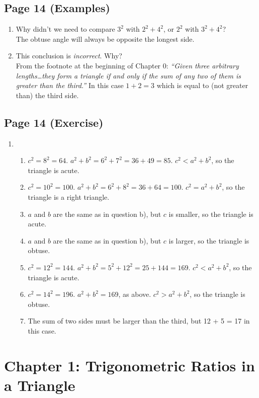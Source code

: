 \documentclass{article}
\newenvironment{solutions}[1]
{\subsection*{#1}
 \begin{enumerate}[leftmargin=1.5em]}
{\end{enumerate}}
\newcommand{\solution}{\item}
\newenvironment{subsolutions}
{\begin{enumerate}}
{\end{enumerate}}
\newcommand{\subsolution}{\item}
\begin{document}
\begin{solutions}{Page 14 (Examples)}
\solution Why didn't we need to compare $3^2$ with $2^2 + 4^2$, or $2^2$ with $3^2 + 4^2$?\\
The obtuse angle will always be opposite the longest side. 
\solution This conclusion is \textit{incorrect}. Why?\\
From the footnote at the beginning of Chapter 0: \textit{``Given three arbitrary lengths\ldots they form a triangle if and only if the sum of any two of them is greater than the third.''}
In this case $1 + 2 = 3$ which is equal to (not greater than) the third side.
\end{solutions}

\begin{solutions}{Page 14 (Exercise)}
\solution
\begin{subsolutions}
\subsolution $c^2 = 8^2 = 64$. $a^2 +b^2 = 6^2 + 7^2 = 36 + 49 = 85$. $c^2 < a^2 + b^2$, so the triangle is acute.
\subsolution $c^2 = 10^2 = 100$. $a^2 +b^2 = 6^2 + 8^2 = 36 + 64 = 100$. $c^2 = a^2 + b^2$, so the triangle is a right triangle.
\subsolution $a$ and $b$ are the same as in question b), but $c$ is smaller, so the triangle is acute.
\subsolution $a$ and $b$ are the same as in question b), but $c$ is larger, so the triangle is obtuse.
\subsolution $c^2 = 12^2 = 144$. $a^2 +b^2 = 5^2 + 12^2 = 25 + 144 = 169$. $c^2 < a^2 + b^2$, so the triangle is acute.
\subsolution $c^2 = 14^2 = 196$. $a^2 +b^2 = 169$, as above. $c^2 > a^2 + b^2$, so the triangle is obtuse.
\subsolution The sum of two sides must be larger than the third, but 12 + 5 = 17 in this case.
\end{subsolutions}
\end{solutions}


\section*{Chapter 1: Trigonometric Ratios in a Triangle}
\end{document}
